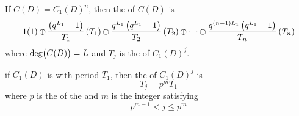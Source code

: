 \begin{theorem}\label{thm:Cycle_Set_Multiple_of_Connection_Polynomial}
  If $C(D) = {C_{1}(D)}^{n}$, then the  of $C(D)$ is
  \begin{equation}\label{eq:Cycle_Set_Multiple_of_Connection_Polynomial}
    1(1) \operatorname{\oplus} \frac{\left( q^{L_{1}}-1 \right)}{T_{1}} \left( T_{1} \right) \operatorname{\oplus} \frac{q^{L_{1}} \left( q^{L_{1}}-1 \right)}{T_{2}} \left( T_{2} \right) \operatorname{\oplus} \cdots \operatorname{\oplus} \frac{q^{(n-1)L_{1}}\left( q^{L_{1}}-1 \right)}{T_{n}} \left( T_{n} \right)
  \end{equation}
  where $\operatorname{\operatorname{deg}} \bigl( C(D) \bigr) = L$ and $T_{j}$ is the  of ${C_{1}(D)}^{j}$.
\end{theorem}

\begin{theorem}\label{thm:Irreducible_Connection_Polynomial_Multiple_Cycle_Set}
  if $C_{1}(D)$ is  with period $T_{1}$, then the  of ${C_{1}(D)}^{j}$ is
  \begin{equation}\label{eq:Irreducible_Connection_Polynomial_Multiple_Cycle_Set}
    T_{j} = p^{m}T_{1}
  \end{equation}
  where $p$ is the  of the  and $m$ is the integer satisfying
  \begin{equation}\label{eq:Irreducible_Connection_Polynomial_Multiple_Cycle_Set_Requirement}
    p^{m-1} < j \leq p^{m}
  \end{equation}
\end{theorem}

